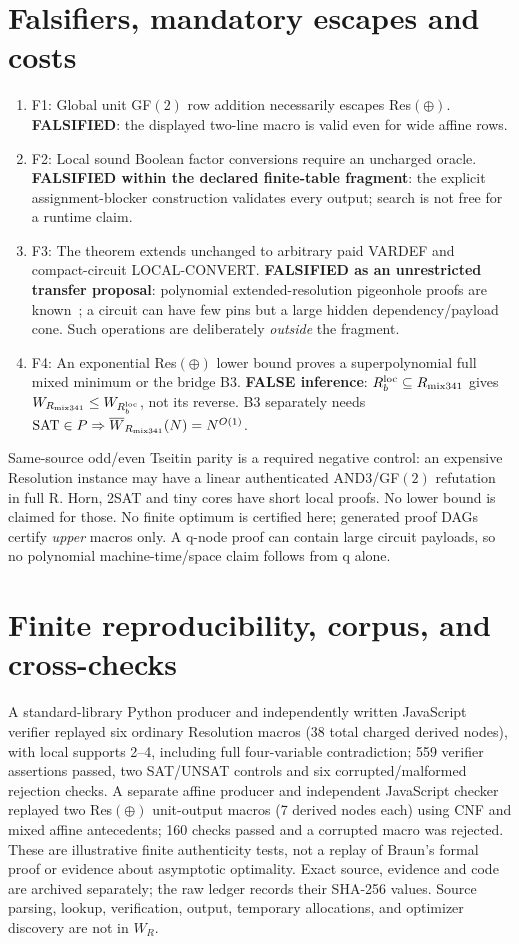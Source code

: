 \documentclass[11pt]{article}
\begin{document}
\section*{Falsifiers, mandatory escapes and costs}
\begin{enumerate}
\item[] F1: Global unit GF$(2)$ row addition necessarily escapes Res$(\oplus)$. \textbf{FALSIFIED}: the displayed two-line macro is valid even for wide affine rows.
\item[] F2: Local sound Boolean factor conversions require an uncharged oracle. \textbf{FALSIFIED within the declared finite-table fragment}: the explicit assignment-blocker construction validates every output; search is not free for a runtime claim.
\item[] F3: The theorem extends unchanged to arbitrary paid VARDEF and compact-circuit LOCAL-CONVERT. \textbf{FALSIFIED as an unrestricted transfer proposal}: polynomial extended-resolution pigeonhole proofs are known~\cite{CR,Buss}; a circuit can have few pins but a large hidden dependency/payload cone. Such operations are deliberately \emph{outside} the fragment.
\item[] F4: An exponential Res$(\oplus)$ lower bound proves a superpolynomial full mixed minimum or the bridge B3. \textbf{FALSE inference}: $R^{\rm loc}_b\subseteq R_{\rm mix341}$ gives $W_{R_{\rm mix341}}\le W_{R^{\rm loc}_b}$, not its reverse. B3 separately needs $\mathrm{SAT}\in P\Rightarrow\overline W_{R_{\rm mix341}}(N)=N^{O(1)}$.
\end{enumerate}
Same-source odd/even Tseitin parity is a required negative control: an expensive Resolution instance may have a linear authenticated AND3/GF$(2)$ refutation in full R. Horn, 2SAT and tiny cores have short local proofs. No lower bound is claimed for those. No finite optimum is certified here; generated proof DAGs certify \emph{upper} macros only. A q-node proof can contain large circuit payloads, so no polynomial machine-time/space claim follows from q alone.

\section*{Finite reproducibility, corpus, and cross-checks}
A standard-library Python producer and independently written JavaScript verifier replayed six ordinary Resolution macros (38 total charged derived nodes), with local supports 2--4, including full four-variable contradiction; 559 verifier assertions passed, two SAT/UNSAT controls and six corrupted/malformed rejection checks. A separate affine producer and independent JavaScript checker replayed two Res$(\oplus)$ unit-output macros (7 derived nodes each) using CNF and mixed affine antecedents; 160 checks passed and a corrupted macro was rejected. These are illustrative finite authenticity tests, not a replay of Braun's formal proof or evidence about asymptotic optimality. Exact source, evidence and code are archived separately; the raw ledger records their SHA-256 values. Source parsing, lookup, verification, output, temporary allocations, and optimizer discovery are not in $W_R$.
\end{document}

